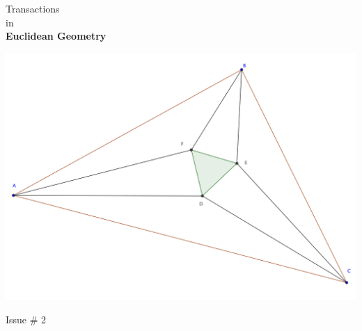 \documentclass{report}
\begin{document}
\thispagestyle{empty}
\begin{center}
{\Huge Transactions\\ in\\ \textbf{Euclidean Geometry}}

\vspace{1in}

\includegraphics[width=1.1\textwidth]{cover-image.png}



\vfill
{\Huge Issue \# 2}
\end{center}
\end{document}
